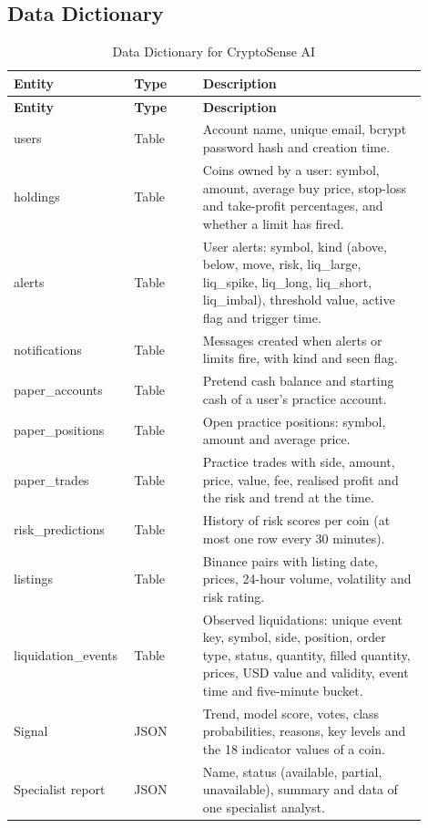 \subsection{Data Dictionary}
{\renewcommand{\arraystretch}{1.3}
\begin{longtable}{|p{0.22\linewidth}|p{0.16\linewidth}|p{0.52\linewidth}|}
\caption{Data Dictionary for CryptoSense AI}\label{tab:datadict}\\\hline
\textbf{Entity} & \textbf{Type} & \textbf{Description}\\\hline\endfirsthead
\hline\textbf{Entity} & \textbf{Type} & \textbf{Description}\\\hline\endhead
users & Table & Account name, unique email, bcrypt password hash and creation time.\\\hline
holdings & Table & Coins owned by a user: symbol, amount, average buy price, stop-loss and take-profit percentages, and whether a limit has fired.\\\hline
alerts & Table & User alerts: symbol, kind (above, below, move, risk, liq\_large, liq\_spike, liq\_long, liq\_short, liq\_imbal), threshold value, active flag and trigger time.\\\hline
notifications & Table & Messages created when alerts or limits fire, with kind and seen flag.\\\hline
paper\_accounts & Table & Pretend cash balance and starting cash of a user's practice account.\\\hline
paper\_positions & Table & Open practice positions: symbol, amount and average price.\\\hline
paper\_trades & Table & Practice trades with side, amount, price, value, fee, realised profit and the risk and trend at the time.\\\hline
risk\_predictions & Table & History of risk scores per coin (at most one row every 30 minutes).\\\hline
listings & Table & Binance pairs with listing date, prices, 24-hour volume, volatility and risk rating.\\\hline
liquidation\_events & Table & Observed liquidations: unique event key, symbol, side, position, order type, status, quantity, filled quantity, prices, USD value and validity, event time and five-minute bucket.\\\hline
Signal & JSON & Trend, model score, votes, class probabilities, reasons, key levels and the 18 indicator values of a coin.\\\hline
Specialist report & JSON & Name, status (available, partial, unavailable), summary and data of one specialist analyst.\\\hline
\end{longtable}}


